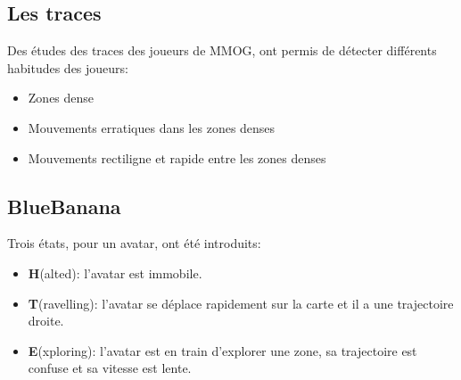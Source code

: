 \documentclass{beamer}
\begin{document}
  \subsection{Les traces}
  \begin{frame}
	Des études des traces des joueurs de MMOG, ont permis de détecter différents habitudes des joueurs:
	\begin{itemize}
		\item Zones dense 
		\item Mouvements erratiques dans les zones denses
		\item Mouvements rectiligne et rapide entre les zones denses
	\end{itemize}
  \end{frame}

  \subsection{BlueBanana}
  \begin{frame}
	 Trois états, pour un avatar, ont été introduits:
        \begin{itemize}
                \item \textbf{H}(alted): l'avatar est immobile.
                \item \textbf{T}(ravelling): l'avatar se déplace rapidement sur la carte et il a une trajectoire droite.
                \item \textbf{E}(xploring): l'avatar est en train d'explorer une zone, sa trajectoire est confuse et sa vitesse est lente.
        \end{itemize}
  \end{frame}
\end{document}
